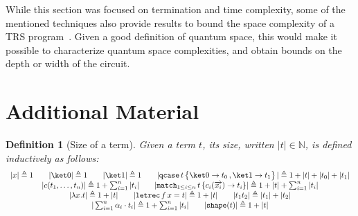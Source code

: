 \documentclass[10pt,a4paper]{article}
\newcommand{\textqcase}{\ensuremath{\mathtt{qcase}}}
\newcommand{\textmatch}{\ensuremath{\mathtt{match}}}
\newcommand{\textletrec}{\ensuremath{\mathtt{letrec}}}
\newcommand{\zket}{\ket 0}
\newcommand{\oket}{\ket 1}
\newcommand{\qcasebase}[2]{
  \textqcase\,#1\left\{\! \begin{aligned} #2 \end{aligned}\right\}
}
\newcommand{\qcase}[3]{
  \qcasebase {#1} {\zket \to #2\,, \oket \to #3}
}
\newcommand{\qcasedefault}[1]{\ensuremath{\qcase{#1}{t_0}{t_1}}}
\newcommand{\matchdefaultcollapsedany}[2]{
  \textmatch_{1 \leq i \leq n}\,#1\,\{
    c_i(\overrightarrow{x_i}) \to #2_i
  \}
}
\newcommand{\matchdefaultcollapsed}[1]{\matchdefaultcollapsedany{#1}{t}}
\newcommand{\lbd}[2]{\lambda #1 .#2}
\newcommand{\letrec}[3]{\textletrec\,#1\,#2=#3}
\newcommand{\shape}[1]{\mathtt{shape}(#1)}
\newcommand{\size}[1]{|#1|}
\newcommand{\mbN}{\mathbb N}
\newtheorem{definition}[theorem]{Definition}
\begin{document}
While this section was focused on termination and time complexity, some of the
mentioned techniques also provide results to bound the space complexity of a
TRS program~\cite{BMM11}. Given a good definition of quantum space, this would
make it possible to characterize quantum space complexities, and obtain bounds
on the depth or width of the circuit.



\appendix

\section{Additional Material}
\label{app:additional}

\begin{definition}[Size of a term]
  \label{def:size}
  Given a term $t$, its size, written $\size t \in \mbN$, is defined
  inductively as follows:
  \begingroup
  \renewcommand{\arraystretch}{1.5}
  \[
    \begin{array}{c}
      \size x \triangleq 1
      \qquad
      \size \zket \triangleq 1
      \qquad
      \size \oket \triangleq 1
      \qquad
      \size{\qcasedefault t} \triangleq 1 + \size t + \size{t_0} + \size{t_1} \\
      \size{c(t_1, \dots, t_n)} \triangleq 1 + \sum_{i=1}^n \size{t_i}
      \qquad
      \size{\matchdefaultcollapsed t} \triangleq 1 + \size t +
      \sum_{i=1}^n \size{t_i} \\
      \size{\lbd x t} \triangleq 1 + \size t
      \qquad
      \size{\letrec f x t} \triangleq 1 + \size t
      \qquad
      \size{t_1t_2} \triangleq \size{t_1} + \size{t_2}
      \\
      \size{\sum_{i=1}^n \alpha_i \cdot t_i} \triangleq 1 + \sum_{i=1}^n \size{t_i}
      \qquad
      \size{\shape t} \triangleq 1 + \size t
    \end{array}
  \]
  \endgroup
\end{definition}
\end{document}
